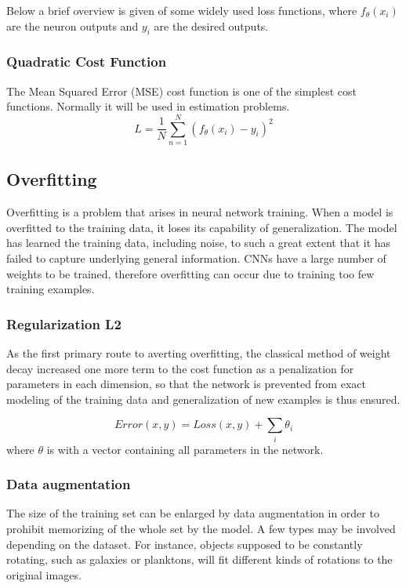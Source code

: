     Below a brief overview is given of some widely used loss functions, where $f_{\theta}(x_i)$ are the neuron outputs and $y_i$ are the desired outputs.
    \subsubsection{Quadratic Cost Function}
    The Mean Squared Error (MSE) cost function is one of the simplest cost functions. Normally it will be used in estimation problems\cite{boureau2008sparse}.
    \begin{equation}
        L =\frac{1}{N}\sum_{n=1}^{N}(f_{\theta}(x_i) - y_i)^2
        \label{eq:mse}
    \end{equation}


    \subsection{Overfitting}
    Overfitting is a problem that arises in neural network training. When a model is overfitted to the training data, it loses its capability of generalization. The model has learned the training data, including noise, to such a great extent that it has failed to capture underlying general information. CNNs have a large number of weights to be trained, therefore overfitting can occur due to training too few training examples.

    \subsubsection{Regularization L2}
     As the first primary route to averting overfitting, the classical method of weight decay increased one more term to the cost function as a penalization for parameters in each dimension, so that the network is prevented from exact modeling of the training data and generalization of new examples is thus ensured. 

    \begin{equation}
        Error(x, y) =  Loss(x, y) + \sum_{i}\theta_i
    \end{equation}
    where $\theta$ is with a vector containing all parameters in the network.

    \subsubsection{Data augmentation}
    The size of the training set can be enlarged by data augmentation in order to prohibit memorizing of the whole set by the model. A few types may be involved depending on the dataset. For instance, objects supposed to be constantly rotating,  such as galaxies or planktons, will fit different kinds of rotations to the original images.

